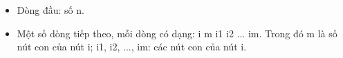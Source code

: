 \begin{itemize}
	\item Dòng đầu: số n.
	\item Một số dòng tiếp theo, mỗi dòng có dạng: i m i1 i2 ... im. Trong đó m là số nút con của nút i; i1, i2, ..., im: các nút con của nút i.
\end{itemize}

\
